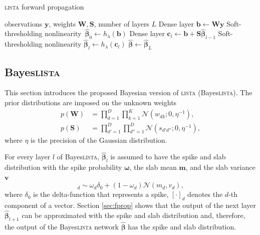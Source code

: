 \documentclass{article}
\begin{document}
  \begin{algorithm}[t]
    \caption{\textsc{lista} forward propagation}
    \label{alg:lista}
    \begin{algorithmic}[1]
      \REQUIRE observations $\mathbf{y}$, weights $\mathbf{W}, \mathbf{S}$, number of layers $L$
      \STATE Dense layer $\mathbf{b} \gets \mathbf{W}\mathbf{y}$ \label{eq:first_layer}
      \STATE Soft-thresholding nonlinearity~$\widehat{\boldsymbol\beta}_0 \gets h_\lambda(\mathbf{b})$ \label{eq:thr_first}
        \STATE Dense layer $\mathbf{c}_l \gets \mathbf{b} + \mathbf{S}\widehat{\boldsymbol\beta}_{l-1}$ \label{eq:l_dense_layer}
        \STATE Soft-thresholding nonlinearity $\widehat{\boldsymbol\beta}_{l} \gets h_\lambda(\mathbf{c}_l)$ \label{eq:l_thr}
      \ENDFOR
      \RETURN $\widehat{\boldsymbol\beta} \gets \widehat{\boldsymbol\beta}_{L}$
    \end{algorithmic}
  \end{algorithm}


  \subsection{Bayes\textsc{lista}}
  \label{subsec:bayesian_lista}
  This section introduces the proposed Bayesian version of \textsc{lista} (Bayes\textsc{lista}). The prior distributions are imposed on the unknown weights
  \begin{equation}
  \label{eq:ws}
  \begin{split}
  p(\mathbf{W}) &= \prod_{d=1}^D\prod_{k=1}^K \mathcal{N}(w_{dk} ; 0, \eta^{-1}), \\
  p(\mathbf{S}) &= \prod_{d'=1}^D\prod_{d''=1}^D \mathcal{N}(s_{d'd''} ; 0, \eta^{-1}),
  \end{split}
  \end{equation}
  where $\eta$ is the precision of the Gaussian distribution.

  For every layer $l$ of Bayes\textsc{lista}, $\widehat{\boldsymbol\beta}_{l}$ is assumed to have the spike and slab distribution with the spike probability $\boldsymbol\omega$, the slab mean $\mathbf{m}$, and the slab variance $\mathbf{v}$
  \begin{equation}
  [\widehat{\boldsymbol\beta}_{l}]_d \sim \omega_d \delta_0 + (1 - \omega_d)\mathcal{N}(m_d, v_d),
  \end{equation}
  where $\delta_0$ is the delta-function that represents a spike, $[\cdot]_d$ denotes the $d$-th component of a vector. Section \ref{sec:fprop} shows that the output of the next layer $\widehat{\boldsymbol\beta}_{l+1}$ can be approximated with the spike and slab distribution and, therefore, the output of the Bayes\textsc{lista} network $\widehat{\boldsymbol\beta}$ has the spike and slab distribution.
\end{document}
